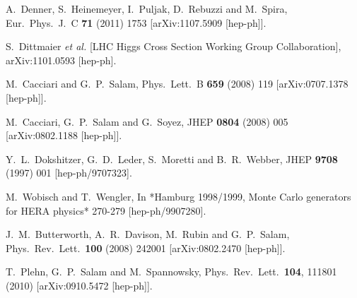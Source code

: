 \documentclass[preprintnumbers,superscriptaddress,nofootinbib,aps,prd,floatfix]{revtex4}
\begin{document}
\begin{thebibliography}{99}
  A.~Denner, S.~Heinemeyer, I.~Puljak, D.~Rebuzzi and M.~Spira,
  Eur.\ Phys.\ J.\ C {\bf 71} (2011) 1753
  [arXiv:1107.5909 [hep-ph]].
  
  S.~Dittmaier {\it et al.}  [LHC Higgs Cross Section Working Group Collaboration],
  arXiv:1101.0593 [hep-ph].

  M.~Cacciari and G.~P.~Salam,
  Phys.\ Lett.\ B {\bf 659} (2008) 119
  [arXiv:0707.1378 [hep-ph]].

  M.~Cacciari, G.~P.~Salam and G.~Soyez,
  JHEP {\bf 0804} (2008) 005
  [arXiv:0802.1188 [hep-ph]].
  
  Y.~L.~Dokshitzer, G.~D.~Leder, S.~Moretti and B.~R.~Webber,
  JHEP {\bf 9708} (1997) 001
  [hep-ph/9707323].
  
  M.~Wobisch and T.~Wengler,
  In *Hamburg 1998/1999, Monte Carlo generators for HERA physics* 270-279
  [hep-ph/9907280].
  
  J.~M.~Butterworth, A.~R.~Davison, M.~Rubin and G.~P.~Salam,
  Phys.\ Rev.\ Lett.\  {\bf 100} (2008) 242001
  [arXiv:0802.2470 [hep-ph]].
        
  T.~Plehn, G.~P.~Salam and M.~Spannowsky,
  Phys.\ Rev.\ Lett.\  {\bf 104}, 111801 (2010)
  [arXiv:0910.5472 [hep-ph]].


\end{thebibliography}
\end{document}
